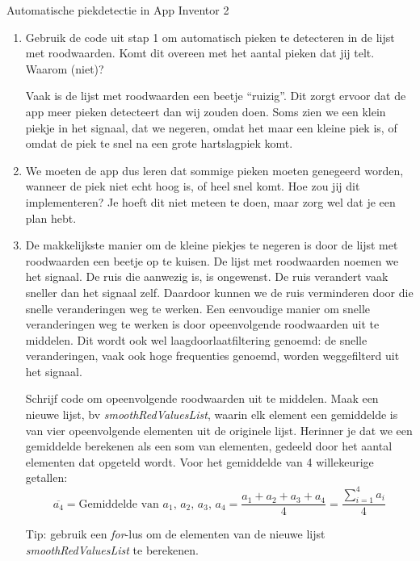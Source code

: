 \begin{opdracht}{Automatische piekdetectie in App Inventor 2}
\begin{enumerate}
\begin{opmerking}
	\end{opmerking}
	
	\item Gebruik de code uit stap 1 om automatisch pieken te detecteren in de lijst met roodwaarden. Komt dit overeen met het aantal pieken dat jij telt. Waarom (niet)?

	\begin{opmerking}
		Vaak is de lijst met roodwaarden een beetje \textquotedblleft ruizig\textquotedblright. Dit zorgt ervoor dat de app meer pieken detecteert dan wij zouden doen. Soms zien we een klein piekje in het signaal, dat we negeren, omdat het maar een kleine piek is, of omdat de piek te snel na een grote hartslagpiek komt. 
	\end{opmerking}

	\item We moeten de app dus leren dat sommige pieken moeten genegeerd worden, wanneer de piek niet echt hoog is, of heel snel komt. Hoe zou jij dit implementeren? Je hoeft dit niet meteen te doen, maar zorg wel dat je een plan hebt.
	
	\item De makkelijkste manier om de kleine piekjes te negeren is door de lijst met roodwaarden een beetje op te kuisen. De lijst met roodwaarden noemen we het signaal. De ruis die aanwezig is, is ongewenst. De ruis verandert vaak sneller dan het signaal zelf. Daardoor kunnen we de ruis verminderen door die snelle veranderingen weg te werken. Een eenvoudige manier om snelle veranderingen weg te werken is door opeenvolgende roodwaarden uit te middelen. Dit wordt ook wel laagdoorlaatfiltering genoemd: de snelle veranderingen, vaak ook hoge frequenties genoemd, worden weggefilterd uit het signaal.
	
	Schrijf code om opeenvolgende roodwaarden uit te middelen. Maak een nieuwe lijst, bv \emph{smoothRedValuesList}, waarin elk element een gemiddelde is van vier opeenvolgende elementen uit de originele lijst. Herinner je dat we een gemiddelde berekenen als een som van elementen, gedeeld door het aantal elementen dat opgeteld wordt.
	Voor het gemiddelde van 4 willekeurige getallen:
	\begin{equation*}
	\overline{a_4} = \text{Gemiddelde van $a_1$, $a_2$, $a_3$, $a_4$} = \frac{a_1+a_2+a_3+a_4}{4} = \frac{\sum_{i=1}^{4} a_i}{4}
	\end{equation*}
	
	\begin{opmerking}
		Tip: gebruik een \emph{for}-lus om de elementen van de nieuwe lijst \emph{smoothRedValuesList} te berekenen.
	\end{opmerking}


\end{enumerate}
\end{opdracht}
